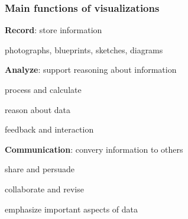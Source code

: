 \documentclass[12pt]{beamer}\usepackage[]{graphicx}\usepackage[]{color}
\begin{document}
\begin{frame}
\frametitle{Main functions of visualizations}

\bi
  \item \textbf{Record}: store information
  \bi
    \item photographs, blueprints, sketches, diagrams
  \ei
  \item \textbf{Analyze}: support reasoning about information
  \bi
    \item process and calculate
    \item reason about data
    \item feedback and interaction
  \ei
  \item \textbf{Communication}: convery information to others
  \bi
    \item share and persuade
    \item collaborate and revise
    \item emphasize important aspects of data
  \ei
\ei

{}

\end{frame}


\begin{frame}
\begin{center}
\Huge{}
\end{center}
\end{frame}


{ %
    \begin{frame}[plain]
     \end{frame}
}
\end{document}
